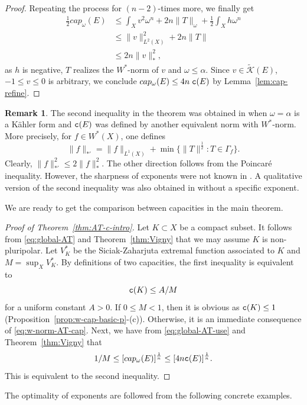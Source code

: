 \documentclass{amsart}
\newcommand{\wt}[1]{\widetilde{#1}}
\newcommand{\al}{\alpha}
\newcommand{\om}{\omega}
\newcommand{\tc}{{\tt c}}
\newcommand{\Ga}{\Gamma}
\newcommand{\cali}[1]{\mathscr{#1}}
\newcommand{\Kc}{\cali{K}}
\theoremstyle{definition}
\newtheorem{remark}[thm]{Remark}
\numberwithin{thm}{section}
\numberwithin{equation}{section}
\renewcommand{\[}{\begin{equation}}
\renewcommand{\]}{\end{equation}}
\begin{document}
\begin{proof}
Repeating the process for $(n-2)$-times more, we finally get
$$\begin{aligned}
	\frac{1}{2} cap_\om(E) 
&\leq  \int_X v^2\om^n  + 2n \|T\|_\om + \frac{1}{2}\int_X h \om^n \\
& \leq  \|v\|_{L^2(X)}^2 + 2n \|T\|\\
&\leq 2n \|v\|_*^2,
\end{aligned}$$
as $h$ is negative, $T$ realizes the $W^*$-norm of $v$ and $\om \leq \al$. Since $v\in \wt\Kc(E)$, $-1\leq v\leq 0$ is arbitrary, we conclude  $cap_\om(E) \leq 4n \;\tc (E)$ by Lemma~\ref{lem:cap-refine}. 
\end{proof}

\begin{remark} \label{rmk:DKN} The second inequality in the theorem was obtained in \cite[Proposition~5.1]{DKN} when $\om=\al$ is a K\"ahler form and $\tc(E)$ was defined by another equivalent norm with $W^*$-norm. More precisely, for $f \in W^*(X)$, one defines
$$
	\| f\|_{*'} = \|f\|_{L^1(X)} + \min\{\|T\|^\frac{1}{2} : T \in \Ga_f\}.	
$$
Clearly, $\|f\|_{*'}^2 \leq 2 \| f\|_*^2$. The other direction follows from the Poincar\'e inequality. However, the sharpness of exponents were not known in \cite{DKN}.  A qualitative version of  the second inequality was also obtained in \cite[Proposition 29]{Vigny} without a specific exponent. 
\end{remark}

We are ready to get the comparison between capacities in the main theorem.

\begin{proof}[Proof of Theorem~\ref{thm:AT-c-intro}] Let $K \subset X$ be a compact subset. It follows from \eqref{eq:global-AT} and Theorem~\ref{thm:Vigny} that we may assume $K$ is non-pluripolar. Let $V_K^*$ be the Siciak-Zaharjuta extremal function associated to $K$ and $M = \sup_X V_K^*$.  By definitions of two capacities, the first inequality is equivalent to 
$$
	\tc(K) \leq A/M
$$
for a uniform constant $A>0$. If $ 0 \leq M <1$, then it is obvious as $\tc(K) \leq 1$ (Proposition~\ref{prop:w-cap-basic-p}-(c)). Otherwise,  it is an immediate consequence of \eqref{eq:w-norm-AT-cap}.
Next, we have from \eqref{eq:global-AT-use} and Theorem~\ref{thm:Vigny} that 
$$
	1/M \leq [cap_\om(E)]^\frac{1}{n} \leq [4n \tc(E)]^\frac{1}{n}.
$$ 
This is equivalent to the second inequality. 
\end{proof}



The optimality of exponents are followed from the following concrete examples.
\end{document}
